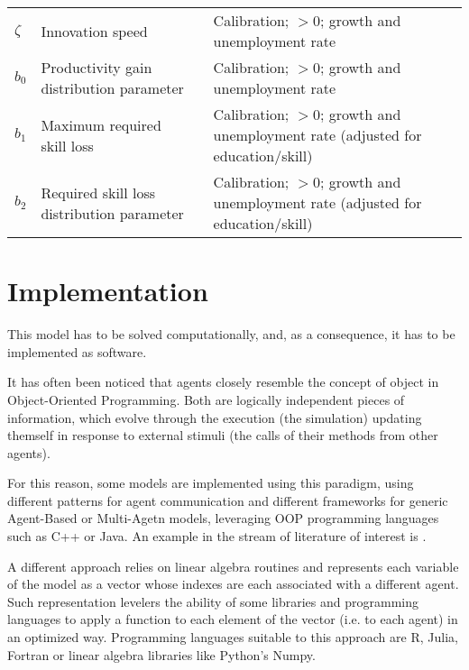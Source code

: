 \documentclass[a4paper, headings=standardclasses]{scrartcl}
\begin{document}
\begin{xltabular}{\linewidth}{lXlX}
    $\zeta$                      & Innovation speed                                             &       & Calibration; $>0$; growth and unemployment rate                                                                                                                                                            \\
    $b_0$                        & Productivity gain distribution parameter                     &       & Calibration; $>0$; growth and unemployment rate                                                                                                                                                               \\
    $b_1$                        & Maximum required skill loss                                  &       & Calibration; $>0$; growth and unemployment rate (adjusted for education/skill)                                                                                                                                                              \\
    $b_2$                        & Required skill loss distribution parameter                   &       &  Calibration; $>0$; growth and unemployment rate (adjusted for education/skill) \\
\end{xltabular}

\theendnotes

\section{Implementation}
This model has to be solved computationally, and, as a consequence, it has to be implemented as software.

It has often been noticed that agents closely resemble the concept of object in Object-Oriented Programming. Both are logically independent pieces of information, which evolve through the execution (the simulation) updating themself in response to external stimuli (the calls of their methods from other agents).

For this reason, some models are implemented using this paradigm, using different patterns for agent communication and different frameworks for generic Agent-Based or Multi-Agetn models, leveraging OOP programming languages such as C++ or Java. An example in the stream of literature of interest is \textcite{caiani2016}.

A different approach relies on linear algebra routines and represents each variable of the model as a vector whose indexes are each associated with a different agent. Such representation levelers the ability of some libraries and programming languages to apply a function to each element of the vector (i.e. to each agent) in an optimized way. Programming languages suitable to this approach are R, Julia, Fortran or linear algebra libraries like Python's Numpy.
\end{document}
